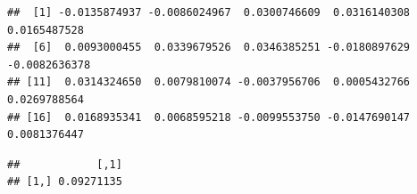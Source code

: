 \documentclass[
]{article}
\newenvironment{Shaded}{\begin{snugshade}}{\end{snugshade}}
\newcommand{\CommentTok}[1]{\textcolor[rgb]{0.56,0.35,0.01}{\textit{#1}}}
\newcommand{\DecValTok}[1]{\textcolor[rgb]{0.00,0.00,0.81}{#1}}
\newcommand{\FunctionTok}[1]{\textcolor[rgb]{0.13,0.29,0.53}{\textbf{#1}}}
\newcommand{\NormalTok}[1]{#1}
\newcommand{\OtherTok}[1]{\textcolor[rgb]{0.56,0.35,0.01}{#1}}
\newcommand{\SpecialCharTok}[1]{\textcolor[rgb]{0.81,0.36,0.00}{\textbf{#1}}}
\newcommand{\StringTok}[1]{\textcolor[rgb]{0.31,0.60,0.02}{#1}}
\begin{document}
\begin{Shaded}
\end{Shaded}

\begin{verbatim}
##  [1] -0.0135874937 -0.0086024967  0.0300746609  0.0316140308  0.0165487528
##  [6]  0.0093000455  0.0339679526  0.0346385251 -0.0180897629 -0.0082636378
## [11]  0.0314324650  0.0079810074 -0.0037956706  0.0005432766  0.0269788564
## [16]  0.0168935341  0.0068595218 -0.0099553750 -0.0147690147  0.0081376447
\end{verbatim}

\begin{Shaded}
\end{Shaded}

\begin{verbatim}
##            [,1]
## [1,] 0.09271135
\end{verbatim}
\end{document}
